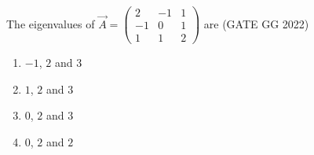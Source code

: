 \item The eigenvalues of 
$\vec{A} = \begin{pmatrix}
2 & -1 & 1 \\
-1 & 0 & 1 \\
1 & 1 & 2
\end{pmatrix}$
are
\hfill(GATE GG 2022)
\begin{multicols}{4}
\begin{enumerate}
\item $-1$, $2$ and $3$  
\item $1$, $2$ and $3$  
\item $0$, $2$ and $3$  
\item $0$, $2$ and $2$  
\end{enumerate}
\end{multicols}
